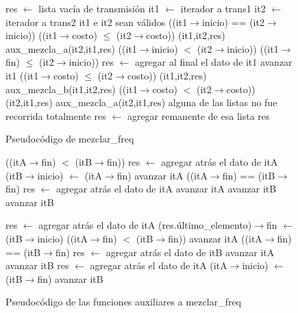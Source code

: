 \begin{figure}[!ht]
\begin{codebox}
\li res $\leftarrow$ lista vacía de transmisión
\li it1 $\leftarrow$ iterador a trans1
\li it2 $\leftarrow$ iterador a trans2
\li \While it1 e it2 sean válidos
\li		\Do 
 		\If ((it1$\rightarrow$inicio) == (it2$\rightarrow$inicio))
\li 			\Then
				\If ((it1$\rightarrow$costo) $\leq$ (it2$\rightarrow$costo))
\li					{}(it1,it2,res)
\li				\Else
					{\sc aux_mezcla_a}(it2,it1,res)
				\End
\li 			\Else
				\If ((it1$\rightarrow$inicio) $<$ (it2$\rightarrow$inicio))
\li				\Then
					\If ((it1$\rightarrow$fin) $\leq$ (it2$\rightarrow$inicio))
\li					\Then
						res $\leftarrow$ agregar al final el dato de it1
\li						avanzar it1
\li					\Else
\li 						\If ((it1$\rightarrow$costo) $\leq$ (it2$\rightarrow$costo))
\li							\Then {\sc aux_mezcla_a}(it1,it2,res)
\li							\Else
								{\sc aux_mezcla_b}(it1,it2,res)
							\End
					\End
\li 				\Else 
\li					\If ((it1$\rightarrow$costo) $<$ (it2$\rightarrow$costo))
\li 						\Then {\sc aux_mezcla_b}(it2,it1,res)
\li 						\Else
 							{\sc aux_mezcla_a}(it2,it1,res)
 						\End
 				\End
 			\End
 		\End
\li \If alguna de las listas no fue recorrida totalmente
\li 		\Then res $\leftarrow$ agregar remanente de esa lista
		\End
\li \Return res
\end{codebox}
\caption{Pseudocódigo de mezclar_freq} \label{code:mezclar}
\end{figure}

\begin{figure}[!ht]
\begin{codebox}
\li	\If((itA$\rightarrow$fin) $<$ (itB$\rightarrow$fin))
\li 		\Then
			res $\leftarrow$ agregar atrás el dato de itA
\li 			(itB$\rightarrow$inicio) $\leftarrow$ (itA$\rightarrow$fin)
\li			avanzar itA
\li 		\Else
			\If ((itA$\rightarrow$fin) == (itB$\rightarrow$fin)
\li				res $\leftarrow$ agregar atrás el dato de itA
\li 				avanzar itA
\li 				avanzar itB
\li 		\Else avanzar itB
		\End
\li		\Return
\end{codebox}

\begin{codebox}
\li res $\leftarrow$ agregar atrás el dato de itA
\li (res.último_elemento)$\rightarrow$fin $\leftarrow$ (itB$\rightarrow$inicio)
\li	\If((itA$\rightarrow$fin) $<$ (itB$\rightarrow$fin))
\li 		\Then avanzar itA
\li 		\Else
			\If ((itA$\rightarrow$fin) == (itB$\rightarrow$fin)
\li				res $\leftarrow$ agregar atrás el dato de itB
\li 				avanzar itA
\li 				avanzar itB
\li 		\Else 
			res $\leftarrow$ agregar atrás el dato de itA
\li 			(itA$\rightarrow$inicio) $\leftarrow$ (itB$\rightarrow$fin)
\li			avanzar itB
		\End
\li		\Return
\end{codebox}
\caption{Pseudocódigo de las funciones auxiliares a mezclar_freq} \label{code:aux}
\end{figure}


